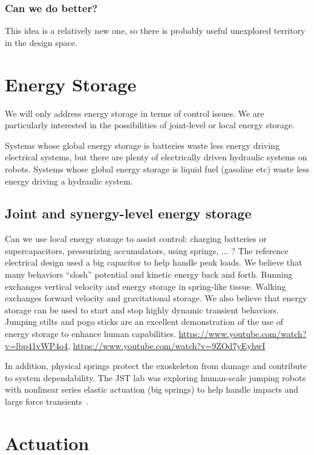 \documentclass[letterpaper,12pt,fullpage]{article}
\begin{document}
\subsubsection{Can we do better?}

This idea is a relatively new one, so there is probably useful unexplored
territory in the design space.

\section{Energy Storage}

We will only address energy storage
in terms of control issues. We are particularly interested in the
possibilities of joint-level or local energy storage.

Systems whose global energy storage is batteries waste
less energy driving electrical systems, but there are plenty of electrically
driven hydraulic systems on robots.
Systems whose global energy storage is liquid fuel (gasoline etc)
waste less energy driving a hydraulic system.

\subsection{Joint and synergy-level energy storage}

Can we use local energy storage to assist control: charging batteries or
supercapacitors, pressurizing accumulators, using springs, ... ?
The reference electrical design used a big capacitor to help handle
peak loads. We believe that many behaviors ``slosh'' potential and
kinetic energy back and forth.
Running exchanges vertical velocity and energy storage in spring-like
tissue.
Walking exchanges forward velocity and gravitational storage.
We also believe that energy storage can be used to start and stop
highly dynamic transient behaviors.
Jumping stilts and pogo sticks are an excellent demonstration
of the use of energy storage to enhance human
capabilities.
\url{https://www.youtube.com/watch?v=lbp41vWP4o4},
\url{https://www.youtube.com/watch?v=9ZOd7yEyhwI}

In addition, physical springs protect the exoskeleton from damage
and contribute to system dependability.
The JST lab was exploring human-scale jumping robots
with 
nonlinear series elastic actuation (big springs)
to help handle impacts and large force
transients~\cite{IEEE06651562}.

\section{Actuation}
\end{document}
